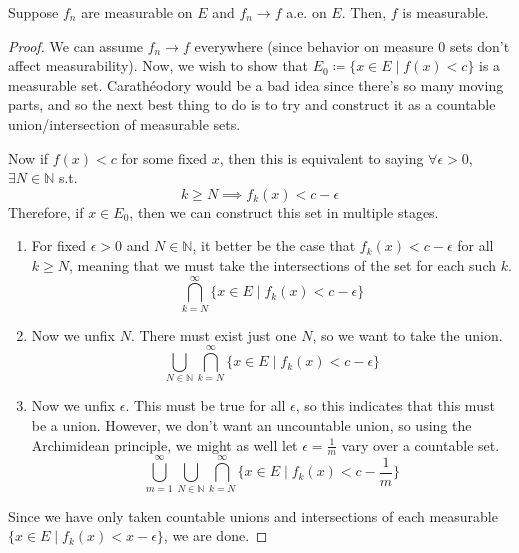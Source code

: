   \begin{theorem}
    Suppose $f_n$ are measurable on $E$ and $f_n \to f$ a.e. on $E$. Then, $f$ is measurable. 
  \end{theorem}
  \begin{proof}
    We can assume $f_n \to f$ everywhere (since behavior on measure $0$ sets don't affect measurability). Now, we wish to show that $E_0 \coloneqq \{x \in E \mid f(x) < c\}$ is a measurable set. Carathéodory would be a bad idea since there's so many moving parts, and so the next best thing to do is to try and construct it as a countable union/intersection of measurable sets. 

    Now if $f(x) < c$ for some fixed $x$, then this is equivalent to saying $\forall \epsilon > 0$, $\exists N \in \mathbb{N}$ s.t. 
    \begin{equation}
      k \geq N \implies f_k (x) < c - \epsilon 
    \end{equation}
    Therefore, if $x \in E_0$, then we can construct this set in multiple stages. 
    \begin{enumerate}
      \item For fixed $\epsilon > 0$ and $N \in \mathbb{N}$, it better be the case that $f_k (x) < c - \epsilon$ for all $k \geq N$, meaning that we must take the intersections of the set for each such $k$. 
      \begin{equation}
        \bigcap_{k = N}^\infty \{ x \in E \mid f_k (x) < c - \epsilon \}
      \end{equation}

      \item Now we unfix $N$. There must exist just one $N$, so we want to take the union. 
      \begin{equation}
        \bigcup_{N \in \mathbb{N}} \bigcap_{k = N}^\infty \{ x \in E \mid f_k (x) < c - \epsilon \}
      \end{equation}

      \item Now we unfix $\epsilon$. This must be true for all $\epsilon$, so this indicates that this must be a union. However, we don't want an uncountable union, so using the Archimidean principle, we might as well let $\epsilon = \frac{1}{m}$ vary over a countable set.  
      \begin{equation}
        \bigcup_{m = 1}^\infty \bigcup_{N \in \mathbb{N}} \bigcap_{k = N}^\infty \{ x \in E \mid f_k (x) < c - \frac{1}{m} \}
      \end{equation}
    \end{enumerate}
    Since we have only taken countable unions and intersections of each measurable $\{x \in E \mid f_k (x) < x - \epsilon\}$, we are done. 
  \end{proof}

